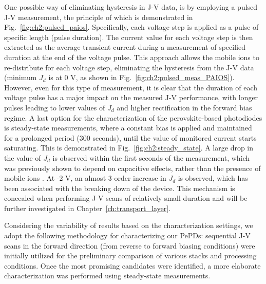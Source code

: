 One possible way of eliminating hysteresis in J-V data, is by employing a pulsed J-V measurement,
the principle of which is demonstrated in Fig.~\ref{fig:ch2:pulsed_paios}. Specifically, each voltage step is applied as a pulse of specific length (pulse duration). The current value for each voltage step is then extracted as the average transient current during a measurement of specified duration at the end of the voltage pulse. This approach allows the mobile ions to re-distribute for each voltage step, eliminating the hysteresis from the J-V data (minimum $J_d$ is at 0 V, as shown in Fig.~\ref{fig:ch2:pulsed_meas_PAIOS}). However, even for this type of measurement, it is clear that the duration of each voltage pulse has a major impact on the measured J-V performance, with longer pulses leading to lower values of $J_d$ and higher rectification in the forward bias regime. A last option for the characterization of the perovskite-based photodiodes is steady-state measurements, where a constant bias is applied and maintained for a prolonged period (300 seconds), until the value of monitored current starts saturating. This is demonstrated in Fig.~\ref{fig:ch2:steady_state}. A large drop in the value of $J_d$ is observed within the first seconds of the measurement, which was previously shown to depend on capacitive effects, rather than the presence of mobile ions \cite{Ollearo2021UltralowGeneration}. At -2 V, an almost 3-order increase in $J_d$ is observed, which has been associated with the breaking down of the device. This mechanism is concealed when performing J-V scans of relatively small duration and will be further investigated in Chapter~\ref{ch:transport_layer}. 

Considering the variability of results based on the characterization settings, we adopt the following methodology for characterizing our PePDs: sequential J-V scans in the forward direction (from reverse to forward biasing conditions) were initially utilized for the preliminary comparison of various stacks and processing conditions. Once the most promising candidates were identified, a more elaborate characterization was performed using steady-state measurements.  


